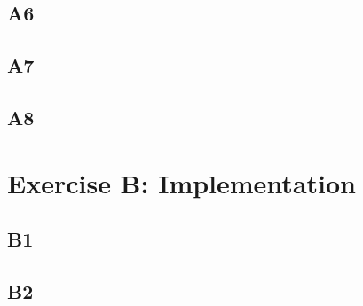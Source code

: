 \documentclass[11pt]{article}
\begin{document}
\subsection*{A6}
\subsection*{A7}
\subsection*{A8}

\section*{Exercise B: Implementation}
\subsection*{B1}
\subsection*{B2}
\end{document}
